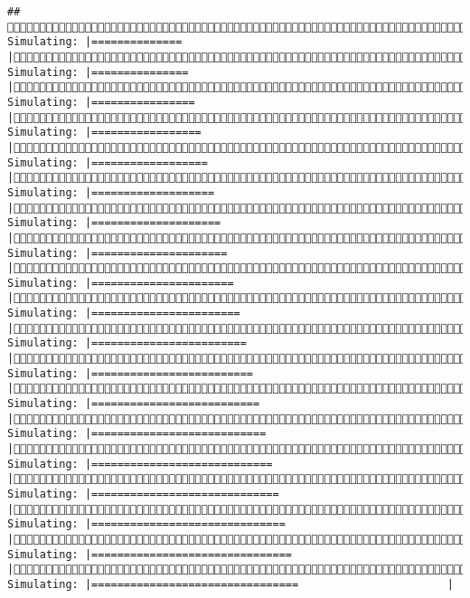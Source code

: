 \documentclass[]{article}
\begin{document}
\begin{verbatim}
## (2/4) Simulating: |==============                                         |(2/4) Simulating: |===============                                        |(2/4) Simulating: |================                                       |(2/4) Simulating: |=================                                      |(2/4) Simulating: |==================                                     |(2/4) Simulating: |===================                                    |(2/4) Simulating: |====================                                   |(2/4) Simulating: |=====================                                  |(2/4) Simulating: |======================                                 |(2/4) Simulating: |=======================                                |(2/4) Simulating: |========================                               |(2/4) Simulating: |=========================                              |(2/4) Simulating: |==========================                             |(2/4) Simulating: |===========================                            |(2/4) Simulating: |============================                           |(2/4) Simulating: |=============================                          |(2/4) Simulating: |==============================                         |(2/4) Simulating: |===============================                        |(2/4) Simulating: |================================                       |
\end{verbatim}
\end{document}

